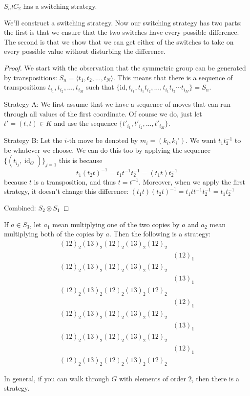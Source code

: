 \begin{theorem}
  $S_n \wr C_2$ has a switching strategy.
\end{theorem}

We'll construct a switching strategy.
Now our switching strategy has two parts: the first is that we ensure that
the two switches have every possible difference. The second is that we show
that we can get either of the switches to take on every possible value without
disturbing the difference.

\begin{proof}
  We start with the observation that the symmetric group can be generated by
  transpositions: $S_n = \langle t_1, t_2, \dots, t_N\rangle$.
  This means that there is a sequence of transpositions $t_{i_1}, t_{i_2}, \dots, t_{i_M}$
  such that $\{\mathrm{id}, t_{i_1}, t_{i_1}t_{i_2}, \dots, t_{i_1}t_{i_2}\cdots t_{i_M}\} = S_n$.

  Strategy A: We first assume that we have a sequence of moves that can run
  through all values of the first coordinate.
  Of course we do, just let $t' = (t, t) \in K$ and use the sequence
  $\{t'_{i_1}, t'_{i_2}, \dots , t'_{i_M}\}$.

  Strategy B: Let the $i$-th move be denoted by $m_i = (k_i, k_i')$.
  We want $t_1t_2^{-1}$ to be whatever we choose. We can do this too by
  applying the sequence $\{(t_{i_j}, \operatorname{id}_G)\}_{j=1}$ this is because
  \[
    t_1(t_2t)^{-1} = t_1t^{-1}t_2^{-1} = (t_1t)t_2^{-1}
  \] because $t$ is a transposition, and thus $t = t^{-1}$.
  Moreover, when we apply the first strategy, it doesn't change this difference:
  $(t_1t)(t_2t)^{-1} = t_1tt^{-1}t_2^{-1} = t_1t_2^{-1}$

  Combined: $S_2 \circledast S_1$
\end{proof}
\begin{example}
  If $a \in S_3$, let $a_1$ mean multiplying one of the two copies by $a$ and
  $a_2$ mean multiplying both of the copies by $a$. Then the following is
  a strategy:
  \begin{align*}
    (12)_2(13)_2(12)_2(13)_2(12)_2 \\
    &(12)_1 \\
    (12)_2(13)_2(12)_2(13)_2(12)_2 \\
    &(13)_1 \\
    (12)_2(13)_2(12)_2(13)_2(12)_2 \\
    &(12)_1 \\
    (12)_2(13)_2(12)_2(13)_2(12)_2 \\
    &(13)_1 \\
    (12)_2(13)_2(12)_2(13)_2(12)_2 \\
    &(12)_1 \\
    (12)_2(13)_2(12)_2(13)_2(12)_2
  \end{align*}
  \label{ex:TwoSymmetricGroups}
\end{example}
In general, if you can walk through $G$ with elements of order $2$, then
there is a strategy.
%
%
